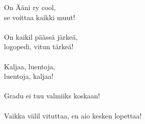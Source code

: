 
On Ääni ry cool, \\
se voittaa kaikki muut! \\ 
\hspace{10mm} \\
On kaikil päässä järkeä, \\
logopedi, vitun tärkeä! \\\hspace{10mm} \\
Kaljaa, luentoja, \\
luentoja, kaljaa! \\
\hspace{10mm} \\
Gradu ei tuu valmiiks koskaan! \\
\hspace{10mm} \\
Vaikka välil vituttaa, en aio kesken lopettaa! \\